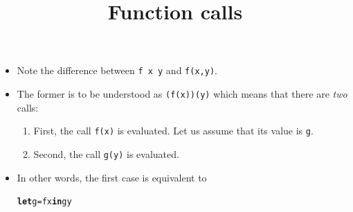 \documentclass[wide]{slides}
\begin{document}
\begin{slide}
  \title{Function calls}

  \begin{itemize}

    \item Note the difference between \verb|f x y|
      and \verb|f(x,y)|.

    \item The former is to be understood as \verb|(f(x))(y)|
      which means that there are \emph{two} calls:
      \begin{enumerate}

        \item First, the call \texttt{f(x)}
          is evaluated. Let us assume that its value is \texttt{g}.

        \item Second, the call \texttt{g(y)} is evaluated.

      \end{enumerate}

    \item In other words, the first case is equivalent to
\begin{alltt}
\textbf{let} g = f x \textbf{in} g y
\end{alltt}

  \end{itemize}
\end{slide}
\end{document}
